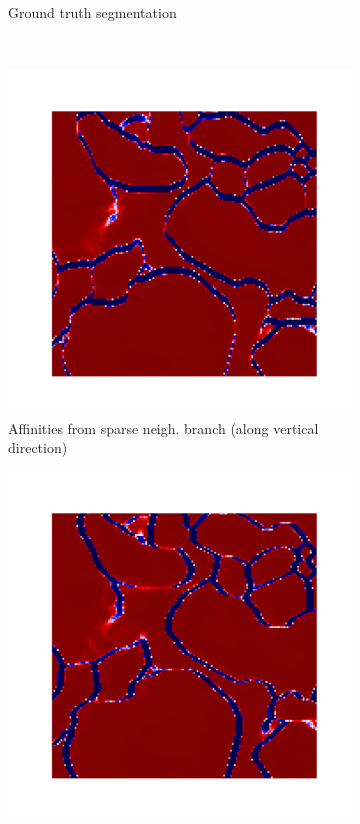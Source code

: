 \begin{figure}[t]
\begin{subfigure}[t]{0.47\textwidth}
\caption{\centering Ground truth segmentation }
\end{subfigure}\vspace{2em}\\
\begin{subfigure}[t]{0.47\linewidth}
\centering
\includegraphics[width=0.75\linewidth,trim=1.50in 1.4in 1.4in 1.50in,clip]{./figs/affs_compare/affs1.pdf} %
\caption{\centering Affinities from sparse neigh. branch (along vertical direction)}
\end{subfigure}\hfill
\begin{subfigure}[t]{0.47\textwidth}
\centering
\includegraphics[width=0.75\linewidth,trim=1.50in 1.4in 1.4in 1.50in,clip]{./figs/affs_compare/affs2.pdf} %

\end{subfigure}
\end{figure}
